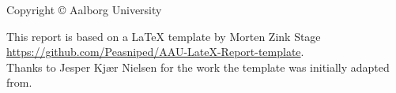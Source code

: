 \thispagestyle{empty}
{\small
\strut\vfill %
\noindent Copyright \copyright{}\mySemesterYear{} Aalborg University\\
\par
\noindent This report is based on a LaTeX template by Morten Zink Stage\\
\url{https://github.com/Peasniped/AAU-LateX-Report-template}.\\
Thanks to Jesper Kjær Nielsen for the work the template was initially adapted from.\par
\vspace{0.2cm}
\noindent \myColophon
}

\clearpage